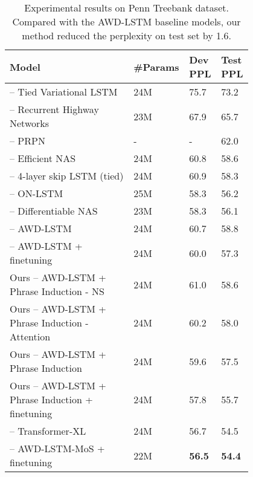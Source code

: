 \documentclass[11pt,a4paper]{article}
\begin{document}
\begin{table*}[ht]
\centering
\begin{tabular}{p{0.5\linewidth}p{0.1\linewidth}p{0.1\linewidth}p{0.1\linewidth}}
\toprule
\textbf{Model} & \textbf{\#Params} & \textbf{Dev PPL} & \textbf{Test PPL}\\
\midrule
\citet{inan2016tying} -- Tied Variational LSTM & 24M & 75.7 & 73.2\\
\citet{zilly2017recurrent} -- Recurrent Highway Networks & 23M & 67.9 & 65.7\\
\citet{shen2017neural} -- PRPN & - & - & 62.0\\
\citet{pham2018efficient} -- Efficient NAS & 24M & 60.8 & 58.6\\
\citet{melis2017state} -- 4-layer skip LSTM (tied) & 24M & 60.9 & 58.3\\
\citet{shen2018ordered} -- ON-LSTM & 25M & 58.3 & 56.2\\
\citet{liu2018darts} -- Differentiable NAS & 23M & 58.3 & 56.1\\
\midrule
\citet{merity2017regularizing} -- AWD-LSTM & 24M & 60.7 & 58.8\\
\citet{merity2017regularizing} -- AWD-LSTM + finetuning & 24M & 60.0 & 57.3\\
\midrule
Ours -- AWD-LSTM + Phrase Induction - NS & 24M & 61.0 & 58.6 \\
Ours -- AWD-LSTM + Phrase Induction - Attention & 24M & 60.2 & 58.0 \\
Ours -- AWD-LSTM + Phrase Induction & 24M & 59.6 & 57.5\\
Ours -- AWD-LSTM + Phrase Induction + finetuning & 24M & 57.8 & 55.7 \\
\midrule
\citet{dai2018transformer} -- Transformer-XL & 24M & 56.7 & 54.5\\
\citet{yang2017breaking} -- AWD-LSTM-MoS + finetuning & 22M & \textbf{56.5} & \textbf{54.4}\\
\bottomrule
\end{tabular}
\caption{Experimental results on Penn Treebank dataset. Compared with the AWD-LSTM baseline models, our method reduced the perplexity on test set by 1.6.}
\label{tab:ptb}
\end{table*}
\end{document}
